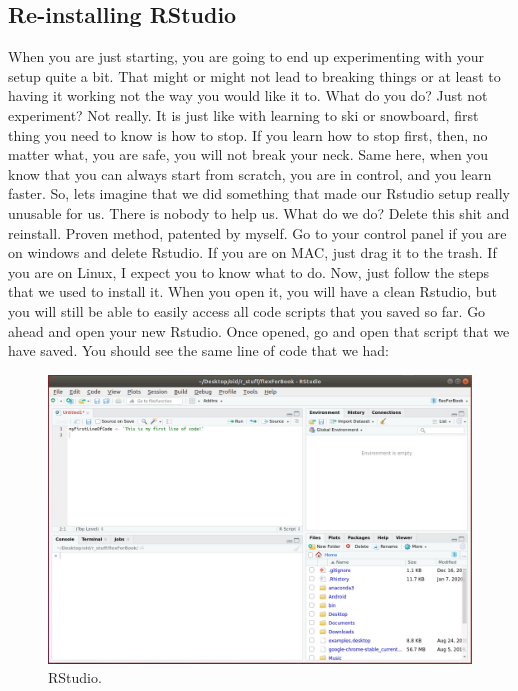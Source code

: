 \documentclass[]{book}
\begin{document}
\hypertarget{re-installing-rstudio}{%
\subsection{Re-installing RStudio}\label{re-installing-rstudio}}

When you are just starting, you are going to end up experimenting with your setup quite a bit. That might or might not lead to breaking things or at least to having it working not the way you would like it to. What do you do? Just not experiment? Not really. It is just like with learning to ski or snowboard, first thing you need to know is how to stop. If you learn how to stop first, then, no matter what, you are safe, you will not break your neck. Same here, when you know that you can always start from scratch, you are in control, and you learn faster. So, lets imagine that we did something that made our Rstudio setup really unusable for us. There is nobody to help us. What do we do? Delete this shit and reinstall. Proven method, patented by myself. Go to your control panel if you are on windows and delete Rstudio. If you are on MAC, just drag it to the trash. If you are on Linux, I expect you to know what to do. Now, just follow the steps that we used to install it. When you open it, you will have a clean Rstudio, but you will still be able to easily access all code scripts that you saved so far. Go ahead and open your new Rstudio. Once opened, go and open that script that we have saved. You should see the same line of code that we had:

\begin{figure}
\centering
\includegraphics{rstudio9.png}
\caption{RStudio.}
\end{figure}
\end{document}
